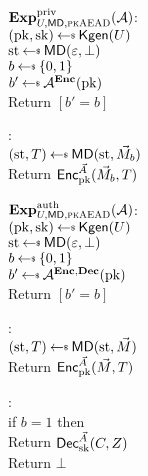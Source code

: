 \begin{figure}[tbhp]
\begin{center}
{
\underline{$\mathbf{Exp}^{\mathrm{priv}}_{U,\mathsf{MD},\textsc{pkAEAD}}{({\cal A})}$}:\\[2pt]
 $(\pk,\sk)\getsr\Kgen(\kreg)$\\
 $\st \getsr \mdalg(\emptystring,\bot)$\\
 $b\getsr\bits$\\
 $b'\getsr\advA^{\encOracle}(\pk)$\\
 Return $[b'=b]$

\medskip
{}:\\[2pt]
$(\st,\umd) \getsr \mdalg(\st,\vmsg_b)$\\
 Return ${\mathsf{Enc}}_{\mathrm{pk}}^{\vec{A}}(\vec{M}_b, T)$

}
{
\underline{$\mathbf{Exp}^{\mathrm{auth}}_{U,\mathsf{MD},\textsc{pkAEAD}}{({\cal A})}$}:\\[2pt]
 $(\pk,\sk)\getsr\Kgen(\kreg)$\\
 $\st \getsr \mdalg(\emptystring,\bot)$\\
 $b\getsr\bits$\\
 $b'\getsr\advA^{\encOracle,\decOracle}(\pk)$\\
 Return $[b'=b]$

\medskip
\Oracle{$\encOracle(\vad,\vmsg)$}:\\[2pt]
 $(\st,\umd) \getsr \mdalg(\st,\vmsg)$\\
 Return ${\mathsf{Enc}}_{\mathrm{pk}}^{\vec{A}}(\vec{M},T)$

\medskip
{}:\\[2pt]
 if $b=1$ then\\
 \nudge Return ${\mathsf{Dec}}_{\mathrm{sk}}^{\vec{A}}(C,Z)$\\
Return $\bot$
}
\caption{}
\end{center}
\end{figure}



